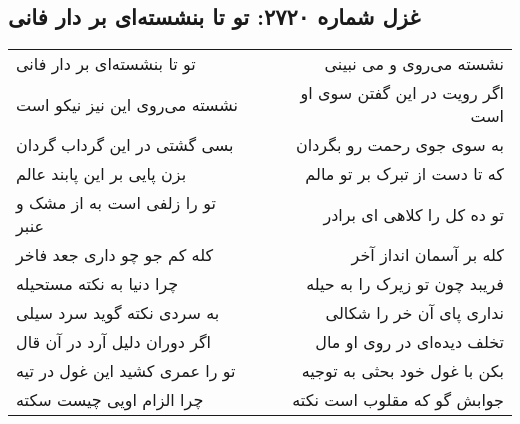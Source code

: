 \begin{center}
\section*{غزل شماره ۲۷۲۰: تو تا بنشسته‌ای بر دار فانی}
\label{sec:2720}
\begin{longtable}{l p{0.5cm} r}
تو تا بنشسته‌ای بر دار فانی
&&
نشسته می‌روی و می نبینی
\\
نشسته می‌روی این نیز نیکو است
&&
اگر رویت در این گفتن سوی او است
\\
بسی گشتی در این گرداب گردان
&&
به سوی جوی رحمت رو بگردان
\\
بزن پایی بر این پابند عالم
&&
که تا دست از تبرک بر تو مالم
\\
تو را زلفی است به از مشک و عنبر
&&
تو ده کل را کلاهی ای برادر
\\
کله کم جو چو داری جعد فاخر
&&
کله بر آسمان انداز آخر
\\
چرا دنیا به نکته مستحیله
&&
فریبد چون تو زیرک را به حیله
\\
به سردی نکته گوید سرد سیلی
&&
نداری پای آن خر را شکالی
\\
اگر دوران دلیل آرد در آن قال
&&
تخلف دیده‌ای در روی او مال
\\
تو را عمری کشید این غول در تیه
&&
بکن با غول خود بحثی به توجیه
\\
چرا الزام اویی چیست سکته
&&
جوابش گو که مقلوب است نکته
\\
\end{longtable}
\end{center}
